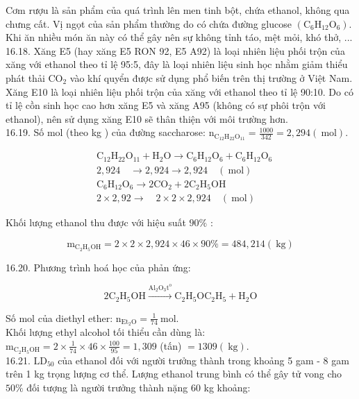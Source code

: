 \documentclass[10pt]{article}
\begin{document}
Cơm rượu là sản phẩm của quá trình lên men tinh bột, chứa ethanol, không qua chưng cất. Vị ngọt của sản phẩm thường do có chứa đường glucose $\left(\mathrm{C}_{6} \mathrm{H}_{12} \mathrm{O}_{6}\right)$. Khi ăn nhiều món ăn này có thể gây nên sự không tỉnh táo, mệt mỏi, khó thở, ...\\
16.18. Xăng E5 (hay xăng E5 RON 92, E5 A92) là loại nhiên liệu phối trộn của xăng với ethanol theo tỉ lệ 95:5, đây là loại nhiên liệu sinh học nhằm giảm thiểu phát thải $\mathrm{CO}_{2}$ vào khí quyển được sử dụng phổ biến trên thị trường ở Việt Nam.\\
Xăng E10 là loại nhiên liệu phối trộn của xăng với ethanol theo tỉ lệ 90:10. Do có tỉ lệ cồn sinh học cao hơn xăng E5 và xăng A95 (không có sự phôi trộn với ethanol), nên sử dụng xăng E10 sẽ thân thiện với môi trường hơn.\\
16.19. Số mol (theo kg ) của đường saccharose: $\mathrm{n}_{\mathrm{C}_{12} \mathrm{H}_{22} \mathrm{O}_{11}}=\frac{1000}{342}=2,294(\mathrm{~mol})$.

$$
\begin{aligned}
& \mathrm{C}_{12} \mathrm{H}_{22} \mathrm{O}_{11}+\mathrm{H}_{2} \mathrm{O} \rightarrow \mathrm{C}_{6} \mathrm{H}_{12} \mathrm{O}_{6}+\mathrm{C}_{6} \mathrm{H}_{12} \mathrm{O}_{6} \\
& 2,924 \quad \rightarrow 2,924 \rightarrow 2,924 \quad(\mathrm{~mol}) \\
& \mathrm{C}_{6} \mathrm{H}_{12} \mathrm{O}_{6} \rightarrow 2 \mathrm{CO}_{2}+2 \mathrm{C}_{2} \mathrm{H}_{5} \mathrm{OH} \\
& 2 \times 2,92 \rightarrow \quad 2 \times 2 \times 2,924 \quad(\mathrm{~mol})
\end{aligned}
$$

Khối lượng ethanol thu được với hiệu suất $90 \%$ :

$$
\mathrm{m}_{\mathrm{C}_{2} \mathrm{H}_{5} \mathrm{OH}}=2 \times 2 \times 2,924 \times 46 \times 90 \%=484,214(\mathrm{~kg})
$$

16.20. Phương trình hoá học của phản ứng:

$$
2 \mathrm{C}_{2} \mathrm{H}_{5} \mathrm{OH} \xrightarrow{\mathrm{Al}_{2} \mathrm{O}_{3} \mathrm{t}^{\mathrm{o}}} \mathrm{C}_{2} \mathrm{H}_{5} \mathrm{OC}_{2} \mathrm{H}_{5}+\mathrm{H}_{2} \mathrm{O}
$$

Số mol của diethyl ether: $\mathrm{n}_{\mathrm{Et}_{2} \mathrm{O}}=\frac{1}{74} \mathrm{~mol}$.\\
Khối lượng ethyl alcohol tối thiểu cần dùng là:\\
$\mathrm{m}_{\mathrm{C}_{2} \mathrm{H}_{5} \mathrm{OH}}=2 \times \frac{1}{74} \times 46 \times \frac{100}{95}=1,309$ (tấn) $=1309(\mathrm{~kg})$.\\
16.21. $\mathrm{LD}_{50}$ của ethanol đối với người trưởng thành trong khoảng 5 gam - 8 gam trên 1 kg trọng lượng cơ thể. Lượng ethanol trung bình có thể gây tử vong cho $50 \%$ đối tượng là người trưởng thành nặng 60 kg khoảng:
\end{document}

